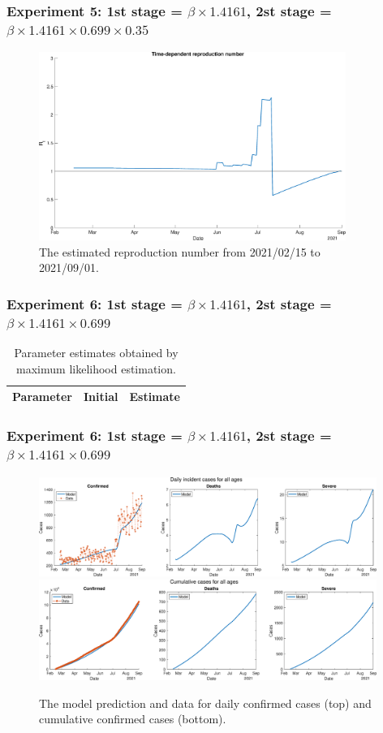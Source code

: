 \documentclass[aspectratio=169, 9pt, xcolor=dvipsnames]{beamer}
\begin{document}
	\begin{frame}\frametitle{Experiment 5: 1st stage = $\beta \times 1.4161$, 2st stage = $\beta \times 1.4161 \times 0.699 \times 0.35$}
	    \begin{figure}
	    	\centering
	    	\includegraphics[width=10cm]{../results/estimate_sd_1st_2_2nd_1/rep_num.eps}
	    	\caption{The estimated reproduction number from 2021/02/15 to 2021/09/01.}
	    \end{figure}
	\end{frame}

	\begin{frame}\frametitle{Experiment 6: 1st stage = $\beta \times 1.4161$, 2st stage = $\beta \times 1.4161 \times 0.699$}
	    \begin{table}
	    	\begin{tabular}{crr}
	    		\toprule
	    		\textbf{Parameter} & \textbf{Initial} & \textbf{Estimate} \\
	    		\midrule
	    		
	    		\bottomrule
	    	\end{tabular}
	    	\caption{Parameter estimates obtained by maximum likelihood estimation.}
	    \end{table}
	\end{frame}

	\begin{frame}\frametitle{Experiment 6: 1st stage = $\beta \times 1.4161$, 2st stage = $\beta \times 1.4161 \times 0.699$}
	    \begin{figure}
	    	\centering
	    	\includegraphics[width=11cm]{../results/estimate_sd_1st_2_2nd_2/daily_all_age.eps}
	    	\includegraphics[width=11cm]{../results/estimate_sd_1st_2_2nd_2/cumul_all_age.eps}
	    	\caption{The model prediction and data for daily confirmed cases (top) and cumulative confirmed cases (bottom).}
	    \end{figure}
	\end{frame}
\end{document}
